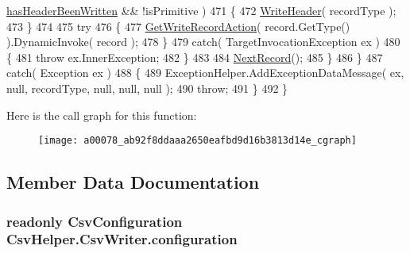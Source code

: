 \begin{DoxyCode}
      \hyperlink{a00078_a48b53b7f4428286805b1eaac1055b2bf}{hasHeaderBeenWritten} && !isPrimitive )
471                     \{
472                         \hyperlink{a00078_af2298dcd2934550fd9dd592921f18541}{WriteHeader}( recordType );
473                     \}
474 
475                     \textcolor{keywordflow}{try}
476                     \{
477                         \hyperlink{a00078_a1ab2b602b050ceb6f0a0874504ddf3f3}{GetWriteRecordAction}( record.GetType() ).DynamicInvoke( record 
      );
478                     \}
479                     \textcolor{keywordflow}{catch}( TargetInvocationException ex )
480                     \{
481                         \textcolor{keywordflow}{throw} ex.InnerException;
482                     \}
483 
484                     \hyperlink{a00078_a397af8c87002d3b9c2b5152c6981d4d2}{NextRecord}();
485                 \}
486             \}
487             \textcolor{keywordflow}{catch}( Exception ex )
488             \{
489                 ExceptionHelper.AddExceptionDataMessage( ex, null, recordType, null, null, null );
490                 \textcolor{keywordflow}{throw};
491             \}
492         \}
\end{DoxyCode}


Here is the call graph for this function\-:
\nopagebreak
\begin{figure}[H]
\begin{center}
\leavevmode
\texttt{[image: a00078\_ab92f8ddaaa2650eafbd9d16b3813d14e\_cgraph]}
\end{center}
\end{figure}




\subsection{Member Data Documentation}
\hypertarget{a00078_a0711748c9a399cfbcbad93857304fc67}{
\subsubsection[{configuration}]{\setlength{\rightskip}{0pt plus 5cm}readonly {\bf Csv\-Configuration} Csv\-Helper.\-Csv\-Writer.\-configuration\hspace{0.3cm}{\ttfamily [private]}}}\label{a00078_a0711748c9a399cfbcbad93857304fc67}


